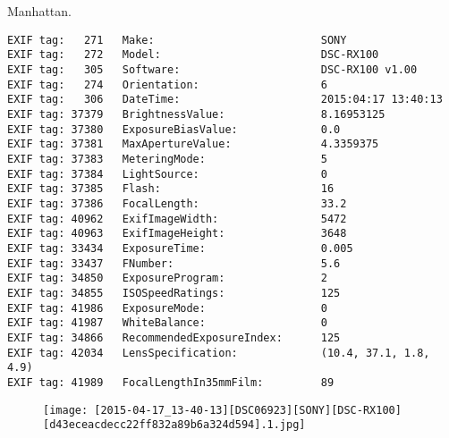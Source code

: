 \section{\protect{}}
\noindent Manhattan.
\noindent
\begin{lstlisting}
EXIF tag:   271   Make:                          SONY
EXIF tag:   272   Model:                         DSC-RX100
EXIF tag:   305   Software:                      DSC-RX100 v1.00
EXIF tag:   274   Orientation:                   6
EXIF tag:   306   DateTime:                      2015:04:17 13:40:13
EXIF tag: 37379   BrightnessValue:               8.16953125
EXIF tag: 37380   ExposureBiasValue:             0.0
EXIF tag: 37381   MaxApertureValue:              4.3359375
EXIF tag: 37383   MeteringMode:                  5
EXIF tag: 37384   LightSource:                   0
EXIF tag: 37385   Flash:                         16
EXIF tag: 37386   FocalLength:                   33.2
EXIF tag: 40962   ExifImageWidth:                5472
EXIF tag: 40963   ExifImageHeight:               3648
EXIF tag: 33434   ExposureTime:                  0.005
EXIF tag: 33437   FNumber:                       5.6
EXIF tag: 34850   ExposureProgram:               2
EXIF tag: 34855   ISOSpeedRatings:               125
EXIF tag: 41986   ExposureMode:                  0
EXIF tag: 41987   WhiteBalance:                  0
EXIF tag: 34866   RecommendedExposureIndex:      125
EXIF tag: 42034   LensSpecification:             (10.4, 37.1, 1.8, 4.9)
EXIF tag: 41989   FocalLengthIn35mmFilm:         89

\end{lstlisting}
\clearpage
\begin{figure}
\raggedleft
\texttt{[image: [2015-04-17\_13-40-13][DSC06923][SONY][DSC-RX100][d43eceacdecc22ff832a89b6a324d594].1.jpg]}
\end{figure}


\clearpage

